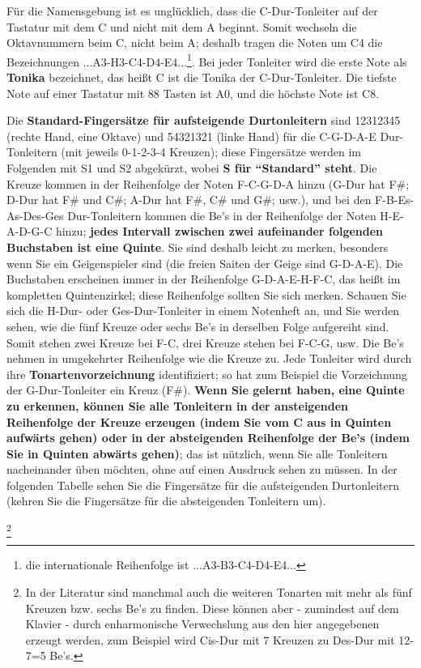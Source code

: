 Für die Namensgebung ist es unglücklich, dass die C-Dur-Tonleiter auf der Tastatur mit dem C und nicht mit dem A beginnt.
Somit wechseln die Oktavnummern beim C, nicht beim A; deshalb tragen die Noten um C4 die Bezeichnungen ...A3-H3-C4-D4-E4...\footnote{die internationale Reihenfolge ist ...A3-B3-C4-D4-E4...}.
Bei jeder Tonleiter wird die erste Note als \textbf{Tonika} bezeichnet, das heißt C ist die Tonika der C-Dur-Tonleiter.
Die tiefste Note auf einer Tastatur mit 88 Tasten ist A0, und die höchste Note ist C8.


\hypertarget{table}{}

Die \textbf{Standard-Fingersätze für aufsteigende Durtonleitern} sind 12312345 (rechte Hand, eine Oktave) und 54321321 (linke Hand) für die C-G-D-A-E Dur-Tonleitern (mit jeweils 0-1-2-3-4 Kreuzen); diese Fingersätze werden im Folgenden mit S1 und S2 abgekürzt, wobei \textbf{S für \enquote{Standard} steht}.
Die Kreuze kommen in der Reihenfolge der Noten F-C-G-D-A hinzu (G-Dur hat F\#; D-Dur hat F\# und C\#; A-Dur hat F\#, C\# und G\#; usw.), und bei den F-B-Es-As-Des-Ges Dur-Tonleitern kommen die Be's in der Reihenfolge der Noten H-E-A-D-G-C hinzu; \textbf{jedes Intervall zwischen zwei aufeinander folgenden Buchstaben ist eine Quinte}.
Sie sind deshalb leicht zu merken, besonders wenn Sie ein Geigenspieler sind (die freien Saiten der Geige sind G-D-A-E).
Die Buchstaben erscheinen immer in der Reihenfolge G-D-A-E-H-F-C, das heißt im kompletten Quintenzirkel; diese Reihenfolge sollten Sie sich merken.
Schauen Sie sich die H-Dur- oder Ges-Dur-Tonleiter in einem Notenheft an, und Sie werden sehen, wie die fünf Kreuze oder sechs Be's in derselben Folge aufgereiht sind.
Somit stehen zwei Kreuze bei F-C, drei Kreuze stehen bei F-C-G, usw.
Die Be's nehmen in umgekehrter Reihenfolge wie die Kreuze zu.
Jede Tonleiter wird durch ihre \textbf{Tonartenvorzeichnung} identifiziert; so hat zum Beispiel die Vorzeichnung der G-Dur-Tonleiter ein Kreuz (F\#).
\textbf{Wenn Sie gelernt haben, eine Quinte zu erkennen, können Sie alle Tonleitern in der ansteigenden Reihenfolge der Kreuze erzeugen (indem Sie vom C aus in Quinten aufwärts gehen) oder in der absteigenden Reihenfolge der Be's (indem Sie in Quinten abwärts gehen)}; das ist nützlich, wenn Sie alle Tonleitern nacheinander üben möchten, ohne auf einen Ausdruck sehen zu müssen.
In der folgenden Tabelle sehen Sie die Fingersätze für die aufsteigenden Durtonleitern (kehren Sie die Fingersätze für die absteigenden Tonleitern um).

\hypertarget{enharmonisch}{}\footnote{In der Literatur sind manchmal auch die weiteren Tonarten mit mehr als fünf Kreuzen bzw. sechs Be's zu finden.
Diese können aber - zumindest auf dem Klavier - durch enharmonische Verwechslung aus den hier angegebenen erzeugt werden, zum Beispiel wird Cis-Dur mit 7 Kreuzen zu Des-Dur mit 12-7=5 Be's.}

